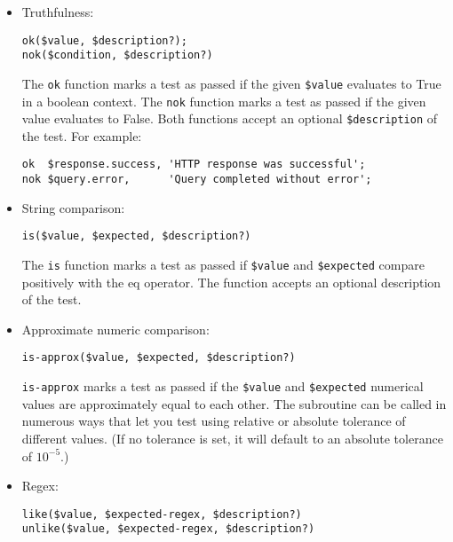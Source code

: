 \begin{itemize}
\item Truthfulness: 
\begin{verbatim}
ok($value, $description?); 
nok($condition, $description?)
\end{verbatim}

The {\tt ok} function marks a test as passed if the given 
\verb'$value' evaluates to True in a boolean context. The 
{\tt nok} function marks a test as passed if the given value 
evaluates to False. Both functions accept an optional 
\verb'$description' of the test. For example:

\begin{verbatim}
ok  $response.success, 'HTTP response was successful';
nok $query.error,      'Query completed without error';
\end{verbatim}

\item String comparison:
\begin{verbatim}
is($value, $expected, $description?)
\end{verbatim}

The {\tt is} function marks a test as passed if \verb'$value' 
and \verb'$expected' compare positively with the eq operator. 
The function accepts an optional description of the test.

\item Approximate numeric comparison:

\begin{verbatim}
is-approx($value, $expected, $description?)
\end{verbatim}

{\tt is-approx} marks a test as passed if the \verb'$value' and 
\verb'$expected' numerical values are approximately equal 
to each other. The subroutine can be called in numerous ways 
that let you test using relative or absolute tolerance 
of different values. (If no tolerance is set, it will default 
to an absolute tolerance of $10^{-5}$.)

\item Regex:

\begin{verbatim}
like($value, $expected-regex, $description?)
unlike($value, $expected-regex, $description?)
\end{verbatim}


\end{itemize}

